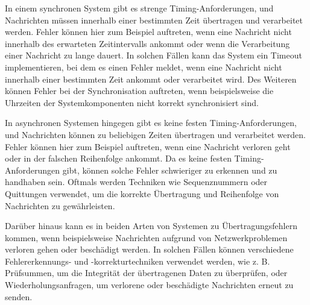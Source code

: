 In einem synchronen System gibt es strenge Timing-Anforderungen, und Nachrichten müssen innerhalb einer bestimmten Zeit übertragen und verarbeitet werden. Fehler können hier zum Beispiel auftreten, wenn eine Nachricht nicht innerhalb des erwarteten Zeitintervalls ankommt oder wenn die Verarbeitung einer Nachricht zu lange dauert. In solchen Fällen kann das System ein Timeout implementieren, bei dem es einen Fehler meldet, wenn eine Nachricht nicht innerhalb einer bestimmten Zeit ankommt oder verarbeitet wird. Des Weiteren können Fehler bei der Synchronisation auftreten, wenn beispielsweise die Uhrzeiten der Systemkomponenten nicht korrekt synchronisiert sind.

In asynchronen Systemen hingegen gibt es keine festen Timing-Anforderungen, und Nachrichten können zu beliebigen Zeiten übertragen und verarbeitet werden. Fehler können hier zum Beispiel auftreten, wenn eine Nachricht verloren geht oder in der falschen Reihenfolge ankommt. Da es keine festen Timing-Anforderungen gibt, können solche Fehler schwieriger zu erkennen und zu handhaben sein. Oftmals werden Techniken wie Sequenznummern oder Quittungen verwendet, um die korrekte Übertragung und Reihenfolge von Nachrichten zu gewährleisten.

Darüber hinaus kann es in beiden Arten von Systemen zu Übertragungsfehlern kommen, wenn beispielsweise Nachrichten aufgrund von Netzwerkproblemen verloren gehen oder beschädigt werden. In solchen Fällen können verschiedene Fehlererkennungs- und -korrekturtechniken verwendet werden, wie z. B. Prüfsummen, um die Integrität der übertragenen Daten zu überprüfen, oder Wiederholungsanfragen, um verlorene oder beschädigte Nachrichten erneut zu senden.

